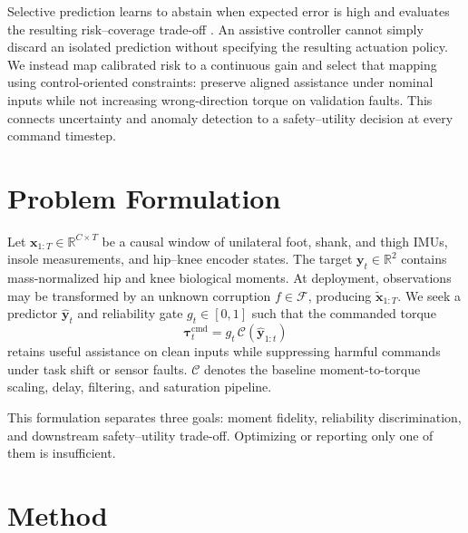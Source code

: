 \documentclass[letterpaper]{article} %
\begin{document}
Selective prediction learns to abstain when expected error is high and evaluates the resulting risk--coverage trade-off \citep{geifman2019selectivenet}.
An assistive controller cannot simply discard an isolated prediction without specifying the resulting actuation policy.
We instead map calibrated risk to a continuous gain and select that mapping using control-oriented constraints: preserve aligned assistance under nominal inputs while not increasing wrong-direction torque on validation faults.
This connects uncertainty and anomaly detection to a safety--utility decision at every command timestep.

\section{Problem Formulation}

Let $\mathbf{x}_{1:T}\in\mathbb{R}^{C\times T}$ be a causal window of unilateral foot, shank, and thigh IMUs, insole measurements, and hip--knee encoder states.
The target $\mathbf{y}_{t}\in\mathbb{R}^{2}$ contains mass-normalized hip and knee biological moments.
At deployment, observations may be transformed by an unknown corruption $f\in\mathcal{F}$, producing $\widetilde{\mathbf{x}}_{1:T}$.
We seek a predictor $\widehat{\mathbf{y}}_t$ and reliability gate $g_t\in[0,1]$ such that the commanded torque
\begin{equation}
    \boldsymbol{\tau}^{\mathrm{cmd}}_t
    = g_t\,\mathcal{C}(\widehat{\mathbf{y}}_{1:t})
\end{equation}
retains useful assistance on clean inputs while suppressing harmful commands under task shift or sensor faults.
$\mathcal{C}$ denotes the baseline moment-to-torque scaling, delay, filtering, and saturation pipeline.

This formulation separates three goals: moment fidelity, reliability discrimination, and downstream safety--utility trade-off.
Optimizing or reporting only one of them is insufficient.

\section{Method}
\end{document}
